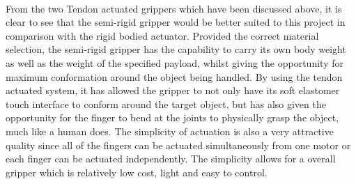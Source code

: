 \documentclass[11pt]{article}
\begin{document}
\\
From the two Tendon actuated grippers which have been discussed above, it is clear to see that the semi-rigid gripper would be better suited to this project in comparison with the rigid bodied actuator. Provided the correct material selection, the semi-rigid gripper has the capability to carry its own body weight as well as the weight of the specified payload, whilst giving the opportunity for maximum conformation around the object being handled. By using the tendon actuated system, it has allowed the gripper to not only have its soft elastomer touch interface to conform around the target object, but has also given the opportunity for the finger to bend at the joints to physically grasp the object, much like a human does. The simplicity of actuation is also a very attractive quality since all of the fingers can be actuated simultaneously from one motor or each finger can be actuated independently. The simplicity allows for a overall gripper which is relatively low cost, light and easy to control.
\pagebreak
\end{document}
